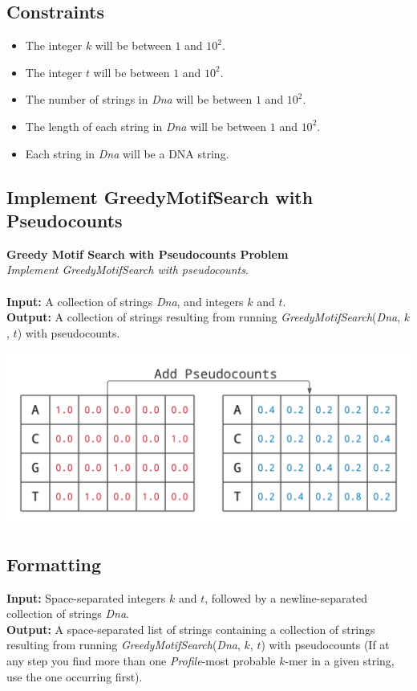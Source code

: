 \documentclass{article}
\begin{document}
\subsection*{Constraints}
\begin{itemize}
    \item The integer $k$ will be between $1$ and $10^2$.
    \item The integer $t$ will be between $1$ and $10^2$.
    \item The number of strings in \emph{Dna} will be between $1$ and $10^2$.
    \item The length of each string in \emph{Dna} will be between $1$ and $10^2$.
    \item Each string in \emph{Dna} will be a DNA string.
\end{itemize}
\pagebreak
\subsection{Implement GreedyMotifSearch with Pseudocounts}
\hline\vspace{5}
\noindent\textbf{Greedy Motif Search with Pseudocounts Problem}\\
\emph{Implement GreedyMotifSearch with pseudocounts}.\\ \\
\textbf{Input:} A collection of strings \emph{Dna}, and integers $k$ and $t$.\\
\textbf{Output:} A collection of strings resulting from running \emph{GreedyMotifSearch}(\emph{Dna}, $k$, $t$) with pseudocounts.
\begin{center}
    \includegraphics[scale=0.15]{c2/logos/2E.png} 
\end{center}
\hline\vspace{5}

\subsection*{Formatting}
\textbf{Input:} Space-separated integers $k$ and $t$, followed by a newline-separated collection of strings \emph{Dna}.\\
\noindent\textbf{Output:} A space-separated list of strings containing a collection of strings resulting from running \emph{GreedyMotifSearch}(\emph{Dna}, $k$, $t$) with pseudocounts (If at any step you find more than one \emph{Profile}-most probable $k$-mer in a given string, use the one occurring first).
\end{document}
